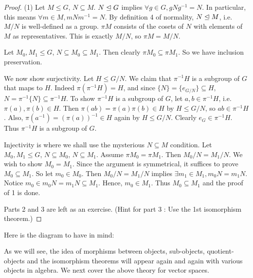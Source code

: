 \documentclass[../book.tex]{subfiles}
\begin{document}
\begin{proof}
    
    (1) Let $M \leq G$, $N \subseteq M$. 
    $N \trianglelefteq G$ implies $\forall g \in G, gNg^{-1} = N$. 
    In particular, this means $\forall m \in M, mNm^{-1} = N$. 
    By definition 4 of normality, $N \trianglelefteq M$, 
    i.e. $M/N$ is well-defined as a group. 
    $\pi M$ consists of the cosets of $N$ with elements of $M$ as representatives. 
    This is exactly $M/N$, so $\pi M = M/N$. 
    
    Let $M_0, M_1 \leq G$, $N \subseteq M_0 \subseteq M_1$.
    Then clearly $\pi M_0 \subseteq \pi M_1$. 
    So we have inclusion preservation. 
    
    We now show surjectivity. Let $H \leq G/N$. 
    We claim that $\pi^{-1} H$ is a subgroup of $G$ that maps to $H$. 
    Indeed $\pi(\pi^{-1} H) = H$, 
    and since $\{N\} = \{e_{G/N}\} \subseteq H$, 
    $N = \pi^{-1} \{N\} \subseteq \pi^{-1} H$.
    To show $\pi^{-1} H$ is a subgroup of $G$, 
    let $a, b \in \pi^{-1} H$, i.e. $\pi(a), \pi(b) \in H$. 
    Then $\pi(ab) = \pi(a)\pi(b) \in H$ by $H \leq G/N$, so $ab \in \pi^{-1} H$. 
    Also, $\pi(a^{-1}) = (\pi(a))^{-1} \in H$ again by $H \leq G/N$. 
    Clearly $e_G \in \pi^{-1} H$. Thus $\pi^{-1} H$ is a subgroup of $G$. 
    
    Injectivity is where we shall use the mysterious $N \subseteq M$ condition. 
    Let $M_0, M_1 \leq G$, $N \subseteq M_0$, $N \subseteq M_1$. 
    Assume $\pi M_0 = \pi M_1$. Then $M_0 / N = M_1 / N$. 
    We wish to show $M_0 = M_1$. 
    Since the argument is symmetrical, it suffices to prove $M_0 \subseteq M_1$. 
    So let $m_0 \in M_0$. Then $M_0 / N = M_1 / N$ implies
    $\exists m_1 \in M_1, m_0 N = m_1 N$. 
    Notice $m_0 \in m_0 N = m_1 N \subseteq M_1$.  
    Hence, $m_0 \in M_1$. Thus $M_0 \subseteq M_1$
    and the proof of 1 is done. 

    Parts 2 and 3 are left as an exercise. 
    (Hint for part 3 : Use the 1st isomorphism theorem.)
\end{proof}

Here is the diagram to have in mind:
\begin{figure}[ht]
    \centering
\end{figure}
\begin{rmk}
    As we will see, 
    the idea of morphisms between objects, 
    sub-objects, quotient-objects and the isomorphism theorems
    will appear again and again with various objects in algebra. 
    We next cover the above theory for vector spaces. 
\end{rmk}
\end{document}
